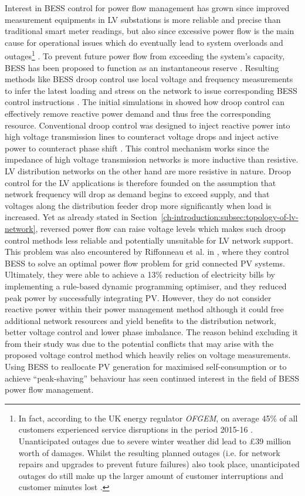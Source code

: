 Interest in BESS control for power flow management has grown since improved measurement equipments in LV substations is more reliable and precise than traditional smart meter readings, but also since excessive power flow is the main cause for operational issues which do eventually lead to system overloads and outages\footnote{
In fact, according to the UK energy regulator \textit{OFGEM}, on average 45\% of all customers experienced service disruptions in the period 2015-16 \cite{Ofgem2017}.
Unanticipated outages due to severe winter weather did lead to \pounds39 million worth of damages.
Whilst the resulting planned outages (i.e. for network repairs and upgrades to prevent future failures) also took place, unanticipated outages do still make up the larger amount of customer interruptions and customer minutes lost \cite{Ofgem2014}.
} \cite{Putrus2009, Pillai2010}.
To prevent future power flow from exceeding the system's capacity, BESS has been proposed to function as an instantaneous reserve \cite{Kunisch1986a, Kunisch1986}.
Resulting methods like BESS droop control use local voltage and frequency measurements to infer the latest loading and stress on the network to issue corresponding BESS control instructions \cite{Engler2005a}.
The initial simulations in \cite{Engler2005a} showed how droop control can effectively remove reactive power demand and thus free the corresponding resource. 
Conventional droop control was designed to inject reactive power into high voltage transmission lines to counteract voltage drops and inject active power to counteract phase shift \cite{Tayab2017}.
This control mechanism works since the impedance of high voltage transmission networks is more inductive than resistive.
LV distribution networks on the other hand are more resistive in nature.
Droop control for the LV applications is therefore founded on the assumption that network frequency will drop as demand begins to exceed supply, and that voltages along the distribution feeder drop more significantly when load is increased.
Yet as already stated in Section~\ref{ch-introduction:subsec:topology-of-lv-network}, reversed power flow can raise voltage levels which makes such droop control methods less reliable and potentially unsuitable for LV network support.
This problem was also encountered by Riffonneau et al. in \cite{Riffonneau2011}, where they control BESS to solve an optimal power flow problem for grid connected PV systems.
Ultimately, they were able to achieve a 13\% reduction of electricity bills by implementing a rule-based dynamic programming optimiser, and they reduced peak power by successfully integrating PV.
However, they do not consider reactive power within their power management method although it could free additional network resources and yield benefits to the distribution network, better voltage control and lower phase imbalance.
The reason behind excluding it from their study was due to the potential conflicts that may arise with the proposed voltage control method which heavily relies on voltage measurements.
Using BESS to reallocate PV generation for maximised self-consumption \cite{SaniHassan2017} or to achieve ``peak-shaving'' behaviour \cite{Bennett2015, DePaola2016} has seen continued interest in the field of BESS power flow management.

